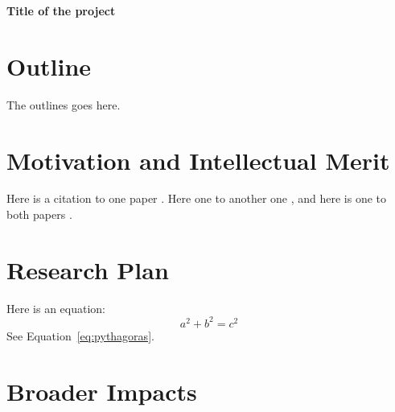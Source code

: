 \documentclass[11pt]{article} %
\begin{document}
\begin{center}
\large{\bf Title of the project}
\end{center}

\section*{Outline}

The outlines goes here.

\section*{Motivation and Intellectual Merit}

Here is a citation to one paper \cite{paper1}. Here one to another one \cite{paper2}, and here is one to both papers \cite{paper1,paper2}.

\section*{Research Plan}

Here is an equation: 
\begin{equation}
\label{eq:pythagoras}
a^2 + b^2 = c^2
\end{equation}
See Equation~\ref{eq:pythagoras}. 

\section*{Broader Impacts}




\end{document}
